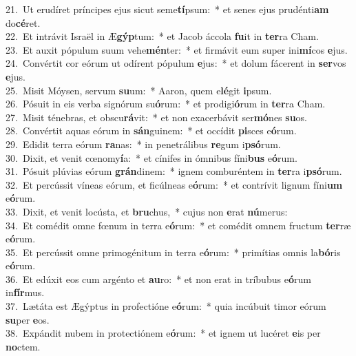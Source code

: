 {21.~}Ut erudíret príncipes ejus sicut seme\textbf{tí}psum:~* et senes ejus prudénti\textbf{am} do\textbf{cé}ret.\\
{22.~}Et intrávit Israël in Æ\textbf{gýp}tum:~* et Jacob áccola \textbf{fu}it in \textbf{ter}ra Cham.\\
{23.~}Et auxit pópulum suum vehe\textbf{mén}ter:~* et firmávit eum super ini\textbf{mí}cos \textbf{e}jus.\\
{24.~}Convértit cor eórum ut odírent pópulum \textbf{e}jus:~* et dolum fácerent in \textbf{ser}vos \textbf{e}jus.\\
{25.~}Misit Móysen, servum \textbf{su}um:~* Aaron, quem e\textbf{lé}git \textbf{i}psum.\\
{26.~}Pósuit in eis verba signórum su\textbf{ó}rum:~* et prodigi\textbf{ó}rum in \textbf{ter}ra Cham.\\
{27.~}Misit ténebras, et obscu\textbf{rá}vit:~* et non exacerbávit ser\textbf{mó}nes \textbf{su}os.\\
{28.~}Convértit aquas eórum in \textbf{sán}guinem:~* et occídit \textbf{pi}sces e\textbf{ó}rum.\\
{29.~}Edidit terra eórum \textbf{ra}nas:~* in penetrálibus \textbf{re}gum i\textbf{psó}rum.\\
{30.~}Dixit, et venit cœnomy\textbf{í}a:~* et cínifes in ómnibus fíni\textbf{bus} e\textbf{ó}rum.\\
{31.~}Pósuit plúvias eórum \textbf{grán}dinem:~* ignem comburéntem in \textbf{ter}ra i\textbf{psó}rum.\\
{32.~}Et percússit víneas eórum, et ficúlneas e\textbf{ó}rum:~* et contrívit lignum fíni\textbf{um} e\textbf{ó}rum.\\
{33.~}Dixit, et venit locústa, et \textbf{bru}chus,~* cujus non \textbf{e}rat \textbf{nú}merus:\\
{34.~}Et comédit omne fœnum in terra e\textbf{ó}rum:~* et comédit omnem fructum \textbf{ter}ræ e\textbf{ó}rum.\\
{35.~}Et percússit omne primogénitum in terra e\textbf{ó}rum:~* primítias omnis la\textbf{bó}ris e\textbf{ó}rum.\\
{36.~}Et edúxit eos cum argénto et \textbf{au}ro:~* et non erat in tríbubus e\textbf{ó}rum in\textbf{fír}mus.\\
{37.~}Lætáta est Ægýptus in profectióne e\textbf{ó}rum:~* quia incúbuit timor eórum \textbf{su}per \textbf{e}os.\\
{38.~}Expándit nubem in protectiónem e\textbf{ó}rum:~* et ignem ut lucéret \textbf{e}is per \textbf{no}ctem.\\
